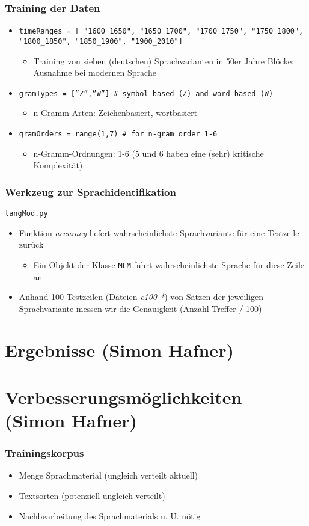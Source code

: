 \documentclass[t]{beamer} %
\begin{document}
\begin{frame}
  \frametitle{Training der Daten}
  \begin{itemize}
  \item \texttt{timeRanges = [ "1600\_1650", "1650\_1700", "1700\_1750", "1750\_1800", "1800\_1850", "1850\_1900", "1900\_2010"]}
  	\begin{itemize}
  	\item Training von sieben (deutschen) Sprachvarianten in 50er Jahre Blöcke; Ausnahme bei modernen Sprache
  	\end{itemize}\pause
  \item \texttt{gramTypes = [''Z'',''W''] \# symbol-based (Z) and word-based (W)}
  	\begin{itemize}
   	\item n-Gramm-Arten: Zeichenbasiert, wortbasiert
  	\end{itemize}\pause
  \item \texttt{gramOrders = range(1,7) \# for n-gram order 1-6}
  	\begin{itemize}
   	\item n-Gramm-Ordnungen: 1-6 (5 und 6 haben eine (sehr) kritische Komplexität)
  	\end{itemize}
  \end{itemize}  
\end{frame}


% 
\begin{frame}
  \frametitle{Werkzeug zur Sprachidentifikation}
  \texttt{langMod.py}
  \begin{itemize}
  \item Funktion \emph{accuracy} liefert wahrscheinlichste Sprachvariante für eine Testzeile zurück
   \begin{itemize}
    \item Ein Objekt der Klasse \texttt{MLM} führt wahrscheinlichste Sprache für diese Zeile an
   \end{itemize}\pause
  \item Anhand 100 Testzeilen (Dateien \emph{e100-*}) von Sätzen der jeweiligen Sprachvariante messen wir die Genauigkeit (Anzahl Treffer / 100)
  \end{itemize}  
\end{frame}

\section{Ergebnisse (Simon Hafner)}

\section{Verbesserungsmöglichkeiten (Simon Hafner)}
\begin{frame}
  \frametitle{Trainingskorpus}
  \begin{itemize}
  \item Menge Sprachmaterial (ungleich verteilt aktuell)\pause
  \item Textsorten (potenziell ungleich verteilt)\pause
  \item Nachbearbeitung des Sprachmaterials u. U. nötig\pause
  \end{itemize}  
\end{frame}
\end{document}
